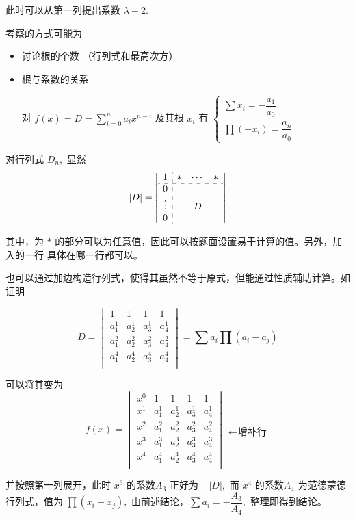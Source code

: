 此时可以从第一列提出系数 $ \lambda - 2. $ 


考察的方式可能为
\begin{itemize}
    \item 讨论根的个数 （行列式和最高次方）
    \item 根与系数的关系
    
    对 $ f(x) = D = \sum_{i = 0}^n a_i x^{n-i} $ 及其根 $ x_i $ 
    有 $ \begin{cases}
        \sum x_i = -\dfrac{a_1}{a_0} \\ 
        \prod (-x_i) = \dfrac{a_n}{a_0}
    \end{cases} $ 
\end{itemize}


对行列式 $ D_n, $ 显然$$
    |D| = \left|
    \begin{array}{c:ccc}
        1&*&\cdots&*\\ \hdashline
        0& & & \\
        \vdots& &D& \\
        0& & & \\
    \end{array}
    \right|
$$ 

其中，为 $ * $ 的部分可以为任意值，因此可以按题面设置易于计算的值。另外，加入的一行
具体在哪一行都可以。

也可以通过加边构造行列式，使得其虽然不等于原式，但能通过性质辅助计算。如证明

$$
    D = \begin{vmatrix}
        1&1&1 &1 \\
        a_1^1&a_2^1 &a_3^1 &a_4^1 \\
        a_1^2&a_2^2 &a_3^2 &a_4^2 \\
        a_1^4&a_2^4 &a_3^4 &a_4^4 \\
    \end{vmatrix} = \sum a_i \prod (a_i - a_j)
$$ 

可以将其变为$$
    f(x) = \begin{vmatrix}
        x^0&1&1&1 &1 \\
        x^1&a_1^1&a_2^1 &a_3^1 &a_4^1 \\
        x^2&a_1^2&a_2^2 &a_3^2 &a_4^2 \\
        x^3&a_1^3&a_2^3 &a_3^3 &a_4^3 \\
        x^4&a_1^4&a_2^4 &a_3^4 &a_4^4 \\
    \end{vmatrix} \begin{matrix}
        \\ \\ \\ \leftarrow \textrm{增补行} \\ \\
    \end{matrix}
$$ 

并按照第一列展开，此时 $ x^3 $ 的系数$ A_3 $ 正好为 $ -|D|, $ 而
$ x^4 $ 的系数$ A_4 $ 为范德蒙德行列式，值为 $ \prod (x_i-x_j), $ 
由前述结论，$ \sum a_i = -\dfrac{A_3}{A_4}, $ 整理即得到结论。
